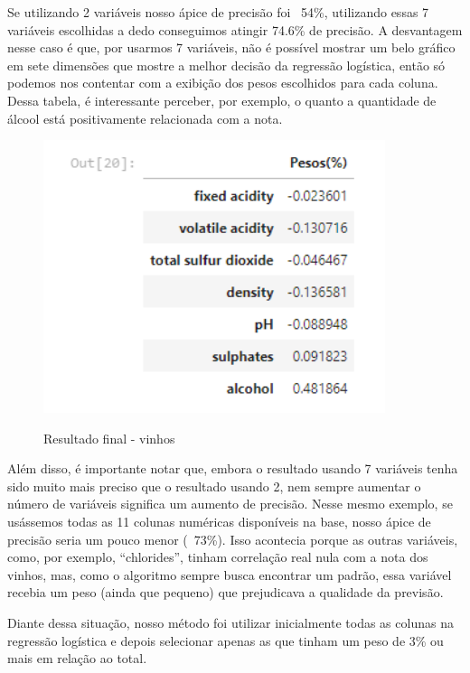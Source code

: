 \documentclass[12pt]{article}
\begin{document}
\begin{itemize}
    \hspace{0.4cm}Se utilizando 2 variáveis nosso ápice de precisão foi ~54\%, utilizando essas 7 variáveis escolhidas a dedo conseguimos atingir 74.6\% de precisão. A desvantagem nesse caso é que, por usarmos 7 variáveis, não é possível mostrar um belo gráfico em sete dimensões que mostre a melhor decisão da regressão logística, então só podemos nos contentar com a exibição dos pesos escolhidos para cada coluna. Dessa tabela, é interessante perceber, por exemplo, o quanto a quantidade de álcool está positivamente relacionada com a nota.

    \begin{figure}[h]
    \caption{Resultado final - vinhos}
    \centering
    \includegraphics[width=10cm]{out3.png}
    \label{figura:out4}
    \end{figure}
    
    \hspace{0.4cm}Além disso, é importante notar que, embora o resultado usando 7 variáveis tenha sido muito mais preciso que o resultado usando 2, nem sempre aumentar o número de variáveis significa um aumento de precisão. Nesse mesmo exemplo, se usássemos todas as 11 colunas numéricas disponíveis na base, nosso ápice de precisão seria um pouco menor (~73\%). Isso acontecia porque as outras variáveis, como, por exemplo, “chlorides”, tinham correlação real nula com a nota dos vinhos, mas, como o algoritmo sempre busca encontrar um padrão, essa variável recebia um peso (ainda que pequeno) que prejudicava a qualidade da previsão.
	
	\hspace{0.4cm}Diante dessa situação, nosso método foi utilizar inicialmente todas as colunas na regressão logística e depois selecionar apenas as que tinham um peso de 3\% ou mais em relação ao total.


\end{itemize}
\end{document}
